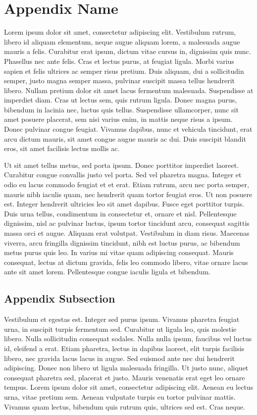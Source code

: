 \section{Appendix Name}
Lorem ipsum dolor sit amet, consectetur adipiscing elit. Vestibulum rutrum,
libero id aliquam elementum, neque augue aliquam lorem, a malesuada augue
mauris a felis. Curabitur erat ipsum, dictum vitae cursus in, dignissim quis
nunc. Phasellus nec ante felis. Cras et lectus purus, at feugiat ligula. Morbi
varius sapien et felis ultrices ac semper risus pretium. Duis aliquam, dui a
sollicitudin semper, justo magna semper massa, pulvinar suscipit massa tellus
hendrerit libero. Nullam pretium dolor sit amet lacus fermentum malesuada.
Suspendisse at imperdiet diam. Cras ut lectus sem, quis rutrum ligula. Donec
magna purus, bibendum in lacinia nec, luctus quis tellus. Suspendisse
ullamcorper, nunc sit amet posuere placerat, sem nisi varius enim, in mattis
neque risus a ipsum. Donec pulvinar congue feugiat. Vivamus dapibus, nunc et
vehicula tincidunt, erat arcu dictum mauris, sit amet congue augue mauris ac
dui. Duis suscipit blandit eros, sit amet facilisis lectus mollis ac.
\par
Ut sit amet tellus metus, sed porta ipsum. Donec porttitor imperdiet laoreet.
Curabitur congue convallis justo vel porta. Sed vel pharetra magna. Integer et
odio eu lacus commodo feugiat et et erat. Etiam rutrum, arcu nec porta semper,
mauris nibh iaculis quam, nec hendrerit quam tortor feugiat eros. Ut non
posuere est. Integer hendrerit ultricies leo sit amet dapibus. Fusce eget
porttitor turpis. Duis urna tellus, condimentum in consectetur et, ornare et
nisl. Pellentesque dignissim, nisl ac pulvinar luctus, ipsum tortor tincidunt
arcu, consequat sagittis massa orci et augue. Aliquam erat volutpat. Vestibulum
in diam risus. Maecenas viverra, arcu fringilla dignissim tincidunt, nibh est
luctus purus, ac bibendum metus purus quis leo. In varius mi vitae quam
adipiscing consequat. Mauris consequat, lectus at dictum gravida, felis leo
commodo libero, vitae ornare lacus ante sit amet lorem. Pellentesque congue
iaculis ligula et bibendum.

\subsection{Appendix Subsection}
Vestibulum et egestas est. Integer sed purus ipsum. Vivamus pharetra feugiat
urna, in suscipit turpis fermentum sed. Curabitur ut ligula leo, quis molestie
libero. Nulla sollicitudin consequat sodales. Nulla nulla ipsum, faucibus vel
luctus id, eleifend a erat. Etiam pharetra, lectus in dapibus laoreet, elit
turpis facilisis libero, nec gravida lacus lacus in augue. Sed euismod ante nec
dui hendrerit adipiscing. Donec non libero ut ligula malesuada fringilla. Ut
justo nunc, aliquet consequat pharetra sed, placerat et justo. Mauris venenatis
erat eget leo ornare tempus. Lorem ipsum dolor sit amet, consectetur adipiscing
elit. Aenean eu lectus urna, vitae pretium sem. Aenean vulputate turpis eu
tortor pulvinar mattis. Vivamus quam lectus, bibendum quis rutrum quis,
ultrices sed est. Cras neque.
